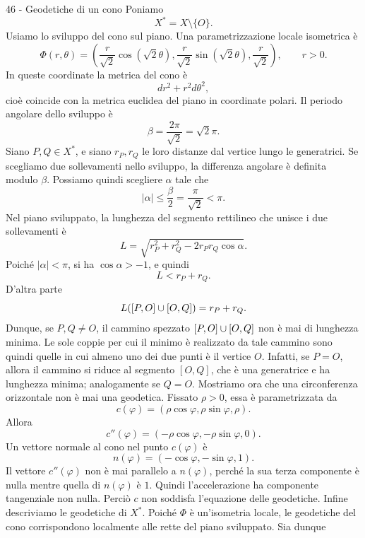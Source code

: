 \documentclass[a4paper]{article}
\begin{document}
\begin{snippetsolution}{46 - Geodetiche di un cono}
    Poniamo
    \[
        X^*=X\setminus\{O\}.
    \]
    Usiamo lo sviluppo del cono sul piano. Una parametrizzazione locale isometrica è
    \[
        \Phi(r,\theta)
        =
        \left(
            \frac{r}{\sqrt{2}}\cos(\sqrt{2}\theta),
            \frac{r}{\sqrt{2}}\sin(\sqrt{2}\theta),
            \frac{r}{\sqrt{2}}
        \right),
        \qquad r>0.
    \]
    In queste coordinate la metrica del cono è
    \[
        dr^2+r^2d\theta^2,
    \]
    cioè coincide con la metrica euclidea del piano in coordinate polari. Il periodo angolare dello sviluppo è
    \[
        \beta=\frac{2\pi}{\sqrt{2}}=\sqrt{2}\pi.
    \]
    Siano \(P,Q\in X^*\), e siano \(r_P,r_Q\) le loro distanze dal vertice lungo le generatrici. Se scegliamo due sollevamenti nello sviluppo, la differenza angolare è definita modulo \(\beta\). Possiamo quindi scegliere \(\alpha\) tale che
    \[
        |\alpha|\leq \frac{\beta}{2}=\frac{\pi}{\sqrt{2}}<\pi.
    \]
    Nel piano sviluppato, la lunghezza del segmento rettilineo che unisce i due sollevamenti è
    \[
        L=
        \sqrt{
            r_P^2+r_Q^2-2r_Pr_Q\cos\alpha
        }.
    \]
    Poiché \(|\alpha|<\pi\), si ha \(\cos\alpha>-1\), e quindi
    \[
        L<r_P+r_Q.
    \]
    D'altra parte
    \[
        L([P,O]\cup[O,Q])=r_P+r_Q.
    \]
    Dunque, se \(P,Q\neq O\), il cammino spezzato \([P,O]\cup[O,Q]\) non è mai di lunghezza minima. Le sole coppie per cui il minimo è realizzato da tale cammino sono quindi quelle in cui almeno uno dei due punti è il vertice \(O\). Infatti, se \(P=O\), allora il cammino si riduce al segmento \([O,Q]\), che è una generatrice e ha lunghezza minima; analogamente se \(Q=O\).
    Mostriamo ora che una circonferenza orizzontale non è mai una geodetica. Fissato \(\rho>0\), essa è parametrizzata da
    \[
        c(\varphi)=(\rho\cos\varphi,\rho\sin\varphi,\rho).
    \]
    Allora
    \[
        c''(\varphi)=(-\rho\cos\varphi,-\rho\sin\varphi,0).
    \]
    Un vettore normale al cono nel punto \(c(\varphi)\) è
    \[
        n(\varphi)=(-\cos\varphi,-\sin\varphi,1).
    \]
    Il vettore \(c''(\varphi)\) non è mai parallelo a \(n(\varphi)\), perché la sua terza componente è nulla mentre quella di \(n(\varphi)\) è \(1\). Quindi l'accelerazione ha componente tangenziale non nulla. Perciò \(c\) non soddisfa l'equazione delle geodetiche.
    Infine descriviamo le geodetiche di \(X^*\). Poiché \(\Phi\) è un'isometria locale, le geodetiche del cono corrispondono localmente alle rette del piano sviluppato. Sia dunque

\end{snippetsolution}
\end{document}
